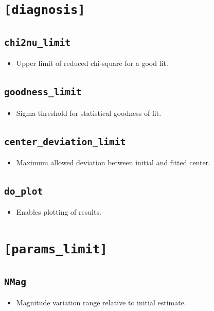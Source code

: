 \documentclass[11pt]{article}
\begin{document}
\section{\texttt{[diagnosis]}}

\subsection{\texttt{chi2nu\_limit}}
\begin{itemize}
\item Upper limit of reduced chi-square for a good fit.
\end{itemize}

\subsection{\texttt{goodness\_limit}}
\begin{itemize}
\item Sigma threshold for statistical goodness of fit.
\end{itemize}

\subsection{\texttt{center\_deviation\_limit}}
\begin{itemize}
\item Maximum allowed deviation between initial and fitted center.
\end{itemize}

\subsection{\texttt{do\_plot}}
\begin{itemize}
\item Enables plotting of results.
\end{itemize}

\section{\texttt{[params\_limit]}}

\subsection{\texttt{NMag}}
\begin{itemize}
\item Magnitude variation range relative to initial estimate.
\end{itemize}
\end{document}
